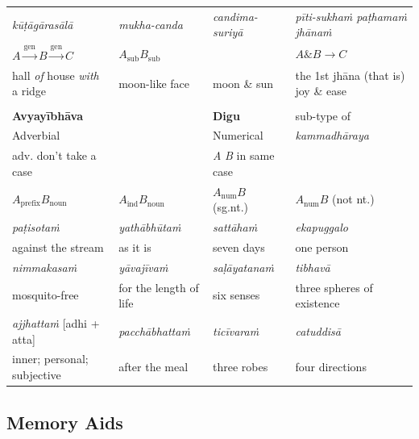 \documentclass[11pt,oneside]{memoir}
\begin{document}
\begin{minipage}{\linewidth+10pt}
\begin{longtable}{llll}
\hline
\emph{kūṭāgārasālā} & \emph{mukha-canda} & \emph{candima-suriyā} & \emph{pīti-sukhaṁ paṭhamaṁ jhānaṁ}\\[0pt]
\(A \xrightarrow{\text{gen}} B \xrightarrow{\text{gen}} C\) & \(A_{\text{sub}} B_{\text{sub}}\) &  & \(A \mathbin{\&} B \rightarrow C\)\\[0pt]
hall \emph{of} house \emph{with} a ridge & moon-like face & moon \& sun & the 1st jhāna (that is) joy \& ease\\[0pt]
 &  &  & \\[0pt]
\hline
\hline
\textbf{Avyayībhāva} &  & \textbf{Digu} & sub-type of\\[0pt]
Adverbial &  & Numerical & \emph{kammadhāraya}\\[0pt]
\hline
adv. don't take a case &  & \emph{A} \emph{B} in same case & \\[0pt]
\hline
\(A_{\text{prefix}} B_{\text{noun}}\) & \(A_{\text{ind}} B_{\text{noun}}\) & \(A_{\text{num}} B\) (sg.nt.) & \(A_{\text{num}} B\) (not nt.)\\[0pt]
\emph{paṭisotaṁ} & \emph{yathābhūtaṁ} & \emph{sattāhaṁ} & \emph{ekapuggalo}\\[0pt]
against the stream & as it is & seven days & one person\\[0pt]
\emph{nimmakasaṁ} & \emph{yāvajīvaṁ} & \emph{saḷāyatanaṁ} & \emph{tibhavā}\\[0pt]
mosquito-free & for the length of life & six senses & three spheres of existence\\[0pt]
\emph{ajjhattaṁ} [adhi + atta] & \emph{pacchābhattaṁ} & \emph{ticīvaraṁ} & \emph{catuddisā}\\[0pt]
inner; personal; subjective & after the meal & three robes & four directions\\[0pt]
\end{longtable}

\end{minipage}

\clearpage

\subsection{Memory Aids}
\label{sec:org4bea2ec}
\end{document}
